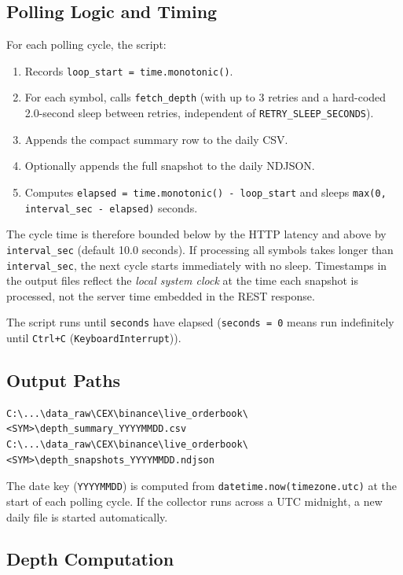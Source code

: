 \documentclass[11pt,a4paper]{article}
\begin{document}
\subsection{Polling Logic and Timing}

For each polling cycle, the script:
\begin{enumerate}
  \item Records \texttt{loop\_start = time.monotonic()}.
  \item For each symbol, calls \texttt{fetch\_depth} (with up to 3
        retries and a hard-coded 2.0-second sleep between retries,
        independent of \texttt{RETRY\_SLEEP\_SECONDS}).
  \item Appends the compact summary row to the daily CSV.
  \item Optionally appends the full snapshot to the daily NDJSON.
  \item Computes \texttt{elapsed = time.monotonic() - loop\_start}
        and sleeps \texttt{max(0, interval\_sec - elapsed)} seconds.
\end{enumerate}

The cycle time is therefore bounded below by the HTTP latency and
above by \texttt{interval\_sec} (default 10.0 seconds). If processing
all symbols takes longer than \texttt{interval\_sec}, the next cycle
starts immediately with no sleep. Timestamps in the output files
reflect the \emph{local system clock} at the time each snapshot is
processed, not the server time embedded in the REST response.

The script runs until \texttt{seconds} have elapsed (\texttt{seconds
= 0} means run indefinitely until \texttt{Ctrl+C}
(\texttt{KeyboardInterrupt})).

\subsection{Output Paths}

\begin{lstlisting}
C:\...\data_raw\CEX\binance\live_orderbook\<SYM>\depth_summary_YYYYMMDD.csv
C:\...\data_raw\CEX\binance\live_orderbook\<SYM>\depth_snapshots_YYYYMMDD.ndjson
\end{lstlisting}

The date key (\texttt{YYYYMMDD}) is computed from
\texttt{datetime.now(timezone.utc)} at the start of each polling cycle.
If the collector runs across a UTC midnight, a new daily file is started
automatically.

\subsection{Depth Computation}
\end{document}
